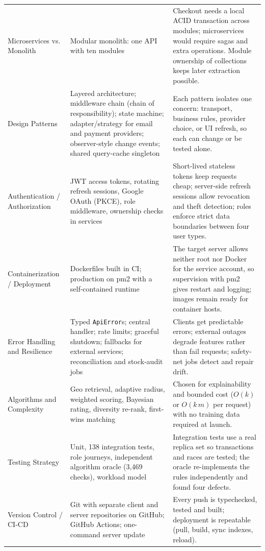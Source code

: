 \documentclass[manuscript,screen,review]{acmart}
\begin{document}
\begin{table}[t]
\begin{tabularx}{\textwidth}{@{}
    p{}
    p{}
    X
    @{}}
    Microservices vs. Monolith &
    Modular monolith: one API with ten modules &
    Checkout needs a local ACID transaction across modules; microservices would require sagas and extra operations. Module ownership of collections keeps later extraction possible. \\

    Design Patterns &
    Layered architecture; middleware chain (chain of responsibility); state machine; adapter/strategy for email and payment providers; observer-style change events; shared query-cache singleton &
    Each pattern isolates one concern: transport, business rules, provider choice, or UI refresh, so each can change or be tested alone. \\

    Authentication / Authorization &
    JWT access tokens, rotating refresh sessions, Google OAuth (PKCE), role middleware, ownership checks in services &
    Short-lived stateless tokens keep requests cheap; server-side refresh sessions allow revocation and theft detection; roles enforce strict data boundaries between four user types. \\

    Containerization / Deployment &
    Dockerfiles built in CI; production on pm2 with a self-contained runtime &
    The target server allows neither root nor Docker for the service account, so supervision with pm2 gives restart and logging; images remain ready for container hosts. \\

    Error Handling and Resilience &
    Typed \texttt{ApiError}s; central handler; rate limits; graceful shutdown; fallbacks for external services; reconciliation and stock-audit jobs &
    Clients get predictable errors; external outages degrade features rather than fail requests; safety-net jobs detect and repair drift. \\

    Algorithms and Complexity &
    Geo retrieval, adaptive radius, weighted scoring, Bayesian rating, diversity re-rank, first-wins matching &
    Chosen for explainability and bounded cost ($O(k)$ or $O(k\,m)$ per request) with no training data required at launch. \\

    Testing Strategy &
    Unit, 138 integration tests, role journeys, independent algorithm oracle (3{,}469 checks), workload model &
    Integration tests use a real replica set so transactions and races are tested; the oracle re-implements the rules independently and found four defects. \\

    Version Control / CI-CD &
    Git with separate client and server repositories on GitHub; GitHub Actions; one-command server update &
    Every push is typechecked, tested and built; deployment is repeatable (pull, build, sync indexes, reload). \\

    \bottomrule
  \end{tabularx}
\end{table}
\end{document}
